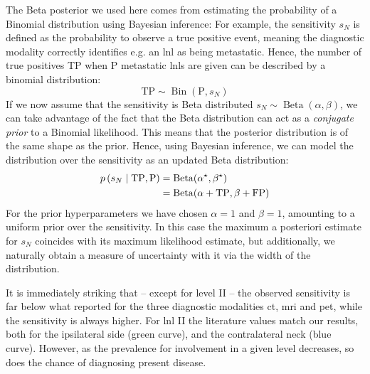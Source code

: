\documentclass[\relativeRoot/main.tex]{subfiles}
\begin{document}
\begin{tcolorbox}[
    title=\faIcon{lightbulb} Beta posterior,
    parbox=false,
    float
] \label{box:dataset_clb:results:beta}%
    The Beta posterior we used here comes from estimating the probability of a Binomial distribution using Bayesian inference: For example, the sensitivity $s_N$ is defined as the probability to observe a true positive event, meaning the diagnostic modality correctly identifies e.g. an \gls{lnl} as being metastatic. Hence, the number of true positives TP when P metastatic \glspl{lnl} are given can be described by a binomial distribution:
    \begin{equation}
        \text{TP} \sim \operatorname{Bin}(\text{P}, s_N)
    \end{equation}
    If we now assume that the sensitivity is Beta distributed $s_N \sim \operatorname{Beta}(\alpha, \beta)$, we can take advantage of the fact that the Beta distribution can act as a \emph{conjugate prior} to a Binomial likelihood. This means that the posterior distribution is of the same shape as the prior. Hence, using Bayesian inference, we can model the distribution over the sensitivity as an updated Beta distribution:
    \begin{equation}
        \begin{aligned}
            p \left( s_N \mid \text{TP},\text{P} \right) &= \operatorname{Beta}(\alpha^\star, \beta^\star) \\
            &= \operatorname{Beta}(\alpha + \text{TP}, \beta + \text{FP})
        \end{aligned}
    \end{equation}
    For the prior hyperparameters we have chosen $\alpha=1$ and $\beta=1$, amounting to a uniform prior over the sensitivity. In this case the maximum a posteriori estimate for $s_N$ coincides with its maximum likelihood estimate, but additionally, we naturally obtain a measure of uncertainty with it via the width of the distribution.

\end{tcolorbox}

It is immediately striking that -- except for level II -- the observed sensitivity is far below what  reported for the three diagnostic modalities \gls{ct}, \gls{mri} and \gls{pet}, while the sensitivity is always higher. For \gls{lnl} II the literature values match our results, both for the ipsilateral side (green curve), and the contralateral neck (blue curve). However, as the prevalence for involvement in a given level decreases, so does the chance of diagnosing present disease.
\end{document}

